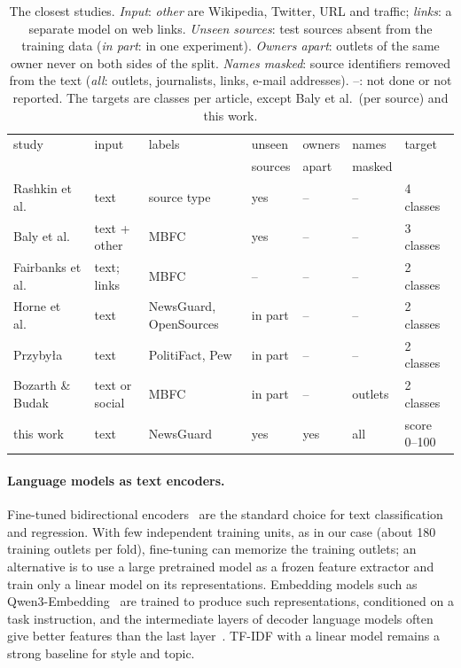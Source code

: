 \documentclass[11pt,a4paper]{article}
\begin{document}
\begin{table}[t]
\centering\small
\caption{The closest studies. \emph{Input}: \emph{other} are Wikipedia, Twitter, URL and traffic; \emph{links}: a
separate model on web links. \emph{Unseen sources}: test sources absent from the training data (\emph{in part}: in one
experiment). \emph{Owners apart}: outlets of the same owner never on both sides of the split. \emph{Names masked}:
source identifiers removed from the text (\emph{all}: outlets, journalists, links, e-mail addresses). --: not done or
not reported. The targets are classes per article, except Baly et al.\ (per source) and this work.}\label{tab:related}
\footnotesize\setlength{\tabcolsep}{3.5pt}
\begin{tabular}{lllllll}
\toprule
study & input & labels & unseen & owners & names & target \\
 & & & sources & apart & masked & \\
\midrule
Rashkin et al.~\cite{rashkin2017truth} & text & source type & yes & -- & -- & 4 classes \\
Baly et al.~\cite{baly2018predicting} & text + other & MBFC & yes & -- & -- & 3 classes \\
Fairbanks et al.~\cite{fairbanks2018credibility} & text; links & MBFC & -- & -- & -- & 2 classes \\
Horne et al.~\cite{horne2019robust} & text & NewsGuard, OpenSources & in part & -- & -- & 2 classes \\
Przyby{\l}a~\cite{przybyla2020capturing} & text & PolitiFact, Pew & in part & -- & -- & 2 classes \\
Bozarth \& Budak~\cite{bozarth2020toward} & text or social & MBFC & in part & -- & outlets & 2 classes \\
\midrule
this work & text & NewsGuard & yes & yes & all & score 0--100 \\
\bottomrule
\end{tabular}
\end{table}

\paragraph{Language models as text encoders.}
Fine-tuned bidirectional encoders~\cite{devlin2019bert,warner2024modernbert} are the standard choice for text
classification and regression. With few independent training units, as in our case (about 180 training outlets per
fold), fine-tuning can memorize the training outlets; an alternative is to use a large pretrained model as a frozen
feature extractor and train only a linear model on its representations. Embedding models such as
Qwen3-Embedding~\cite{zhang2025qwen3} are trained to produce such representations, conditioned on a task instruction,
and the intermediate layers of decoder language models often give better features than the last
layer~\cite{skean2025layer}. TF-IDF with a linear model remains a strong baseline for style and topic.
\end{document}
